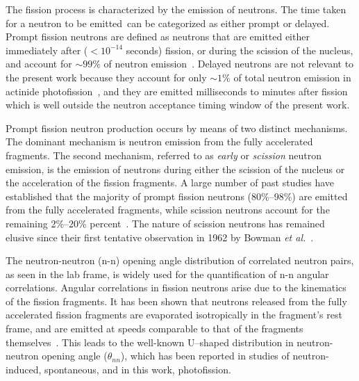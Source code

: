 The fission process is characterized by the emission of neutrons.
The time taken for a neutron to be emitted can be categorized as either prompt or delayed.
Prompt fission neutrons are defined as neutrons that are emitted either immediately after ($<10^{-14}$ seconds) fission, or during the scission of the nucleus, and account for $\sim99\%$ of neutron emission~\cite{Caldwell2017DelayedNs}.
Delayed neutrons are not relevant to the present work because they account for only $\sim1\%$ of total neutron emission in actinide photofission~\cite{Caldwell2017DelayedNs}, and they are emitted milliseconds to minutes after fission which is well outside the neutron acceptance timing window of the present work.

Prompt fission neutron production occurs by means of two distinct mechanisms.
The dominant mechanism is neutron emission from the fully accelerated fragments.
The second mechanism, referred to as \textit{early} or \textit{scission} neutron emission, is the emission of neutrons during either the scission of the nucleus or the acceleration of the fission fragments.
A large number of past studies have established that the majority of prompt fission neutrons (80\%--98\%) are emitted from the fully accelerated fragments, while scission neutrons account for the remaining 2\%--20\% percent~\cite{Scission2005}.
The nature of scission neutrons has remained elusive since their first tentative observation in 1962 by Bowman \emph{et al.}~\cite{Bowman}.

The neutron-neutron (n-n) opening angle distribution of correlated neutron pairs, as seen in the lab frame, is widely used for the quantification of n-n angular correlations.
Angular correlations in fission neutrons arise due to the kinematics of the fission fragments.
It has been shown that neutrons released from the fully accelerated fission fragments are evaporated isotropically in the fragment's rest frame, and are emitted at speeds comparable to that of the fragments themselves~\cite{JORGENSEN}.
This leads to the well-known U--shaped distribution in neutron-neutron opening angle ($\theta_{nn}$), which has been reported in studies of neutron-induced, spontaneous, and in this work, photofission.

